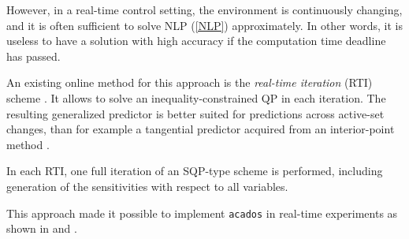 \documentclass{thesisreport}
\begin{document}
However, in a real-time control setting, the environment is continuously changing, and it is often sufficient to solve NLP (\ref{NLP}) approximately. In other words, it is useless to have a solution with high accuracy if the computation time deadline has passed.

An existing online method for this approach is the \textit{real-time iteration} (RTI) scheme \cite{Diehl2002}. It allows to solve an inequality-constrained QP in each iteration. The resulting generalized predictor is better suited for predictions across active-set changes, than for example a tangential predictor  acquired from an interior-point method \cite{acados2019}.

 In each RTI, one full iteration of an SQP-type scheme is performed, including generation of the sensitivities with respect to all variables. 
 
 This approach made it possible to implement \texttt{acados} in real-time experiments as shown in \cite{carlos_sartor_zanelli_frison_burgard_diehl_oriolo_2020}
 and \cite{kloeser_schoels_sartor_zanelli_prison_diehl_2020}.
  
 
 
 
 
 
 
 
 
 
\end{document}

